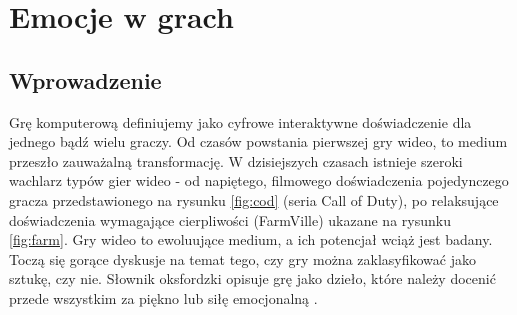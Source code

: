 \chapter{Emocje w grach}
\label{chap:trzeci}

\section{Wprowadzenie}

Grę komputerową definiujemy jako cyfrowe interaktywne doświadczenie dla jednego bądź wielu graczy. Od czasów powstania pierwszej gry wideo, to medium przeszło zauważalną transformację. W dzisiejszych czasach istnieje szeroki wachlarz typów gier wideo - od napiętego, filmowego doświadczenia pojedynczego gracza przedstawionego na rysunku \ref{fig:cod} (seria Call of Duty), po relaksujące doświadczenia wymagające cierpliwości (FarmVille) ukazane na rysunku \ref{fig:farm}. Gry wideo to ewoluujące medium, a ich potencjał wciąż jest badany. Toczą się gorące dyskusje na temat tego, czy gry można zaklasyfikować jako sztukę, czy nie. Słownik oksfordzki opisuje grę jako dzieło, które należy docenić przede wszystkim za piękno lub siłę emocjonalną \citep{button}.


